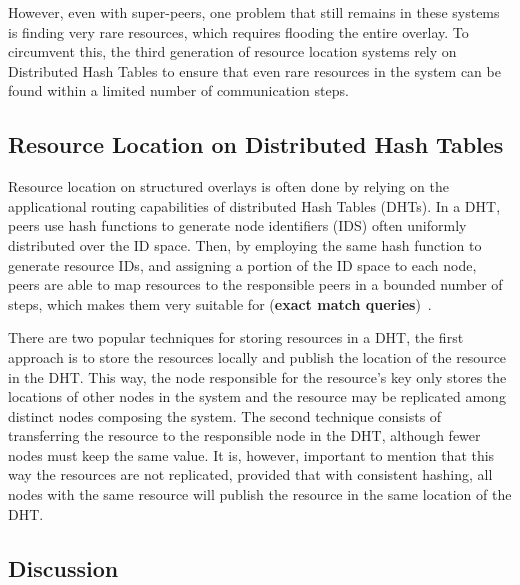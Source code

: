 However, even with super-peers, one problem that still remains in these systems is finding very rare resources, which requires flooding the entire overlay. To circumvent this, the third generation of resource location systems rely on Distributed Hash Tables to ensure that even rare resources in the system can be found within a limited number of communication steps.

\subsection{Resource Location on Distributed Hash Tables}

Resource location on structured overlays is often done by relying on the applicational routing capabilities of distributed Hash Tables (DHTs). In a DHT, peers use hash functions to generate node identifiers (IDS) often uniformly distributed over the ID space. Then, by employing the same hash function to generate resource IDs, and assigning a portion of the ID space to each node, peers are able to map resources to the responsible peers in a bounded number of steps, which makes them very suitable for (\textbf{exact match queries})~\cite{leitaoPHDthesis}. 


There are two popular techniques for storing resources in a DHT, the first approach is to store the resources locally and publish the location of the resource in the DHT. This way, the node responsible for the resource's key only stores the locations of other nodes in the system and the resource may be replicated among distinct nodes composing the system. The second technique consists of transferring the resource to the responsible node in the DHT, although fewer nodes must keep the same value. It is, however, important to mention that this way the resources are not replicated, provided that with consistent hashing, all nodes with the same resource will publish the resource in the same location of the DHT.

\subsection{Discussion}

